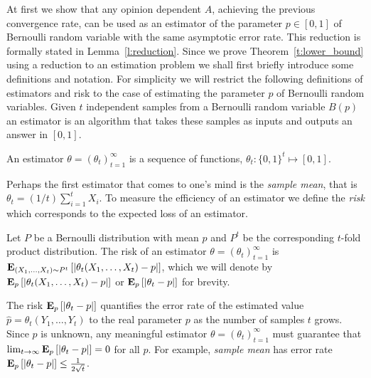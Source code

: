 At first we show that any opinion dependent $A$, achieving the previous
convergence rate, can be used as an estimator of the parameter
$p \in [0,1] $ of Bernoulli random variable with the same asymptotic error
rate. This reduction is formally stated in Lemma~\ref{l:reduction}.
Since we prove Theorem~\ref{t:lower_bound} using a reduction to
an estimation problem we shall first briefly introduce some definitions and
notation. For simplicity we will restrict the following definitions
of estimators and risk to the case of estimating the parameter $p$ of Bernoulli
random variables.
Given $t$ independent samples from a Bernoulli random variable $B(p)$
an estimator is an algorithm that takes these samples as inputs and
outputs an answer in $[0,1]$.
\begin{definition}\label{d:estimator}
  An estimator $\theta=(\theta_t)_{t=1}^{\infty}$
  is a sequence of functions, $\theta_t: \{0,1\}^t\mapsto [0,1]$.
\end{definition}
Perhaps the first estimator that comes to one's mind is the
\emph{sample mean}, that is $\theta_t=(1/t) \sum_{i=1}^t X_i$.
To measure the efficiency of an estimator we define the \emph{risk}
which corresponds to the expected loss of an estimator.
\begin{definition}\label{d:risk}
  Let $P$ be a Bernoulli distribution with mean $p$ and
  $P^t$ be the corresponding $t$-fold product distribution.
  The risk of an estimator $\theta =(\theta_t)_{t=1}^\infty$ is
  $\bm{\mathrm{E}}_{(X_1,\ldots,X_t) \sim P^t} \left[ |\theta_t(X_1,\ldots,X_t) - p| \right]$,
  which we will denote by
  $\bm{\mathrm{E}}_{p} \left[ |\theta_t(X_1,\ldots,X_t) - p| \right]$ or
  $\bm{\mathrm{E}}_{p} \left[ |\theta_t - p| \right]$ for brevity.
\end{definition}
The risk $\bm{\mathrm{E}}_{p} \left[ |\theta_t - p| \right]$ quantifies the error rate of
the estimated value $\hat{p} =\theta_t(Y_1,\ldots,Y_t)$ to the
real parameter $p$ as the number of samples $t$ grows.
Since $p$ is unknown, any meaningful estimator $\theta=(\theta_t)_{t=1}^\infty$
must guarantee that $\lim_{t \to \infty} \bm{\mathrm{E}}_{p} \left[ |\theta_t - p| \right]=0$ for all $p$.
For example, \emph{sample mean} has error rate
$\bm{\mathrm{E}}_{p} \left[ |\theta_t-p| \right] \leq \frac{1}{2\sqrt{t}}$.

